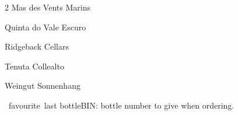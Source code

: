 \documentclass[10pt]{article}
\newcommand{\coeur}{{\color{accent}\faHeart}\ }
\newcommand{\derniere}{{\footnotesize\color{accent}\faWineBottle}\ }
\begin{document}
\begin{multicols}{2}
\noindent Mas des Vents Marins {\color{doux}\dotfill} \par
\noindent Quinta do Vale Escuro {\color{doux}\dotfill} \par
\noindent Ridgeback Cellars {\color{doux}\dotfill} \par
\noindent Tenuta Collealto {\color{doux}\dotfill} \par
\noindent Weingut Sonnenhang {\color{doux}\dotfill} \par
\end{multicols}
\vfill{\footnotesize\color{doux}\noindent\coeur favourite\quad\derniere last bottle\quad BIN: bottle number to give when ordering.\par}
\end{document}
